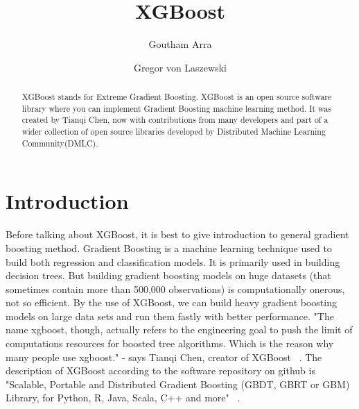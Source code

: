 
\title{XGBoost}


\author{Goutham Arra}

\author{Gregor von Laszewski}




\begin{abstract}  

XGBoost stands for Extreme Gradient Boosting. XGBoost is an open source software
library where you can  implement Gradient Boosting machine learning method. It
was created by Tianqi Chen, now with contributions from many developers and part
of a wider collection of open source libraries developed by Distributed Machine
Learning Community(DMLC).

\end{abstract}



\maketitle


\section{Introduction}  

Before talking about XGBoost, it is best to give introduction to general
gradient boosting method. Gradient Boosting is a machine learning technique used
to build both regression and classification models. It is primarily used in
building decision trees. But building gradient boosting models on huge datasets
(that sometimes contain more than 500,000 observations) is computationally
onerous, not so efficient. By the use of XGBoost, we can build  heavy gradient
boosting models on large data sets and run them fastly with better performance.
"The name xgboost, though, actually refers to the engineering goal to push the
limit of computations resources for boosted tree algorithms. Which is the reason
why many people use xgboost." - says Tianqi Chen, creator of XGBoost ~\cite
{hid-sp18-401-XGBoost-MLmastery}. The description of XGBoost according to the
software repository on github is "Scalable, Portable and Distributed Gradient
Boosting (GBDT, GBRT or GBM) Library, for Python, R, Java, Scala, C++ and more"
~\cite{hid-sp18-401-XGBoost-Github}.



